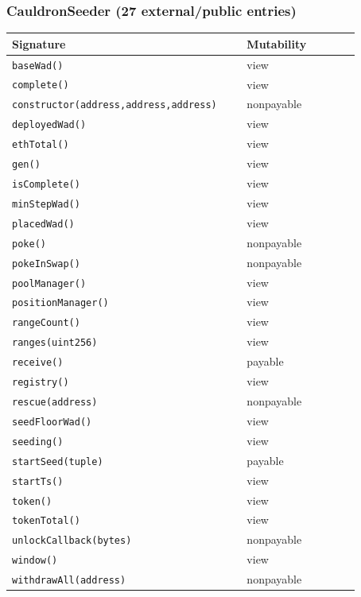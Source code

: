 \subsubsection*{CauldronSeeder \;\normalfont\small(27 external/public entries)}
\begin{longtable}{@{}p{0.62\linewidth}p{0.30\linewidth}@{}}
\toprule \textbf{Signature} & \textbf{Mutability} \\ \midrule \endhead
\texttt{\scriptsize baseWad()} & view \\
\texttt{\scriptsize complete()} & view \\
\texttt{\scriptsize constructor(address,address,address)} & nonpayable \\
\texttt{\scriptsize deployedWad()} & view \\
\texttt{\scriptsize ethTotal()} & view \\
\texttt{\scriptsize gen()} & view \\
\texttt{\scriptsize isComplete()} & view \\
\texttt{\scriptsize minStepWad()} & view \\
\texttt{\scriptsize placedWad()} & view \\
\texttt{\scriptsize poke()} & nonpayable \\
\texttt{\scriptsize pokeInSwap()} & nonpayable \\
\texttt{\scriptsize poolManager()} & view \\
\texttt{\scriptsize positionManager()} & view \\
\texttt{\scriptsize rangeCount()} & view \\
\texttt{\scriptsize ranges(uint256)} & view \\
\texttt{\scriptsize receive()} & payable \\
\texttt{\scriptsize registry()} & view \\
\texttt{\scriptsize rescue(address)} & nonpayable \\
\texttt{\scriptsize seedFloorWad()} & view \\
\texttt{\scriptsize seeding()} & view \\
\texttt{\scriptsize startSeed(tuple)} & payable \\
\texttt{\scriptsize startTs()} & view \\
\texttt{\scriptsize token()} & view \\
\texttt{\scriptsize tokenTotal()} & view \\
\texttt{\scriptsize unlockCallback(bytes)} & nonpayable \\
\texttt{\scriptsize window()} & view \\
\texttt{\scriptsize withdrawAll(address)} & nonpayable \\
\bottomrule\end{longtable}

